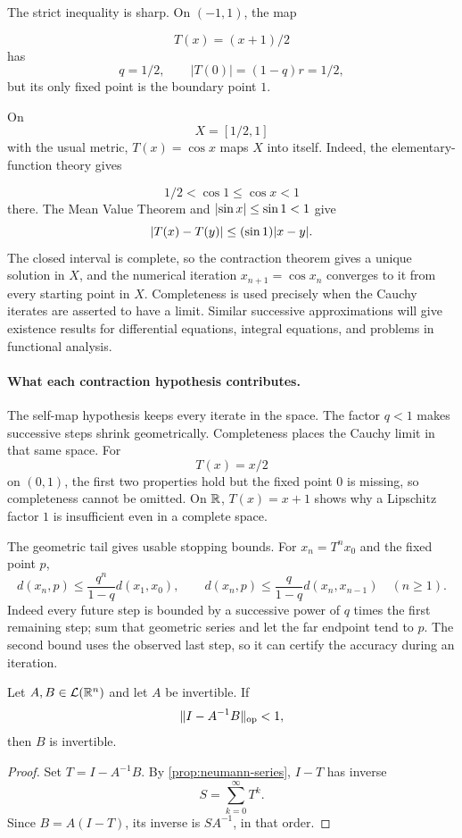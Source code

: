 The strict inequality is sharp. On $(-1,1)$, the map

\[
T(x)=(x+1)/2
\]
 has
\[
q=1/2,\qquad |T(0)|=(1-q)r=1/2,
\]
 but its only fixed point is the boundary point $1$.

\begin{example}[Solving $x=\cos x$ by iteration]
On
\[
X=[1/2,1]
\]
 with the usual metric, $T(x)=\cos x$ maps $X$ into itself.
Indeed, the elementary-function theory gives

\[
1/2<\cos1\leq\cos x<1
\]
 there.  The Mean Value Theorem and
$\lvert \sin x\rvert\leq\sin1<1$ give
\[
\lvert T(x)-T(y)\rvert\leq(\sin1)\lvert x-y\rvert.
\]
The closed interval is complete, so the contraction theorem gives a unique
solution in $X$, and the numerical iteration
$x_{n+1}=\cos x_n$ converges to it from every starting point in $X$.
Completeness is used precisely when the Cauchy iterates are asserted to have
a limit. Similar successive approximations will give existence results for
differential equations, integral equations, and problems in functional
analysis.
\end{example}

\paragraph{What each contraction hypothesis contributes.}
The self-map hypothesis keeps every iterate in the space. The factor
$q<1$ makes successive steps shrink geometrically. Completeness places
the Cauchy limit in that same space. For
\[
T(x)=x/2
\]
 on $(0,1)$,
the first two properties hold but the fixed point $0$ is missing, so
completeness cannot be omitted. On $\mathbb{R}$, $T(x)=x+1$ shows why a
Lipschitz factor $1$ is insufficient even in a complete space.

The geometric tail gives usable stopping bounds. For $x_n=T^nx_0$
and the fixed point $p$,
\[
d(x_n,p)\leq\frac{q^n}{1-q}d(x_1,x_0),\qquad
d(x_n,p)\leq\frac{q}{1-q}d(x_n,x_{n-1})\quad(n\geq1).
\]
Indeed every future step is bounded by a successive power of $q$ times
the first remaining step; sum that geometric series and let the far
endpoint tend to $p$. The second bound uses the observed last step,
so it can certify the accuracy during an iteration.
\begin{proposition}
\label{prop:perturbation}
Let $A,B\in\mathcal L(\mathbb{R}^n)$ and let $A$ be invertible. If
\[
\lVert I-A^{-1}B\rVert_{\mathrm{op}}<1,
\]
then $B$ is invertible.
\end{proposition}
\begin{proof}
Set $T=I-A^{-1}B$. By \cref{prop:neumann-series}, $I-T$ has
inverse
\[
S=\sum_{k=0}^\infty T^k.
\]
 Since $B=A(I-T)$, its inverse is
$SA^{-1}$, in that order.
\end{proof}



